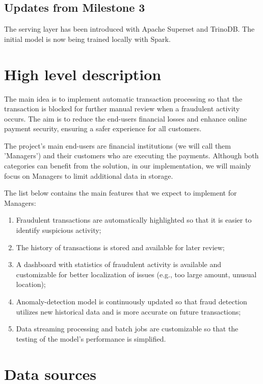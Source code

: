 \documentclass[12pt,a4paper, hidelinks]{article}
\begin{document}
\subsection*{Updates from Milestone 3}
The serving layer has been introduced with Apache Superset and TrinoDB. The initial model is now being trained locally with Spark.



\section{High level description}

The main idea is to implement automatic transaction processing so that the transaction is blocked for further manual review when a fraudulent activity occurs. The aim is to reduce the end-users financial losses and enhance online payment security, ensuring a safer experience for all customers.

The project's main end-users are financial institutions (we will call them 'Managers') and their customers who are executing the payments. Although both categories can benefit from the solution, in our implementation, we will mainly focus on Managers to limit additional data in storage.

The list below contains the main features that we expect to implement for Managers:
\begin{enumerate}
    \item Fraudulent transactions are automatically highlighted so that it is easier to identify suspicious activity;
    \item The history of transactions is stored and available for later review;
    \item A dashboard with statistics of fraudulent activity is available and customizable for better localization of issues (e.g., too large amount, unusual location);
    \item Anomaly-detection model is continuously updated so that fraud detection utilizes new historical data and is more accurate on future transactions;
    \item Data streaming processing and batch jobs are customizable so that the testing of the model's performance is simplified.
\end{enumerate}


\newpage

\section{Data sources}
\end{document}
